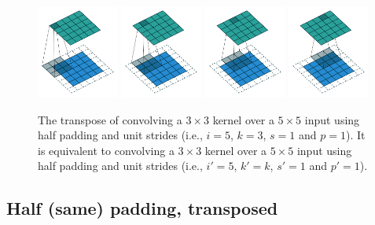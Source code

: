 \documentclass[notitlepage]{report}
\begin{document}
\begin{figure}[p]
    \centering
    \includegraphics[width=0.24\textwidth]{pdf/same_padding_no_strides_transposed_00.pdf}
    \includegraphics[width=0.24\textwidth]{pdf/same_padding_no_strides_transposed_01.pdf}
    \includegraphics[width=0.24\textwidth]{pdf/same_padding_no_strides_transposed_02.pdf}
    \includegraphics[width=0.24\textwidth]{pdf/same_padding_no_strides_transposed_03.pdf}
    \caption{\label{fig:same_padding_no_strides_transposed} The transpose of
        convolving a $3 \times 3$ kernel over a $5 \times 5$ input using half
        padding and unit strides (i.e., $i = 5$, $k = 3$, $s = 1$ and $p = 1$).
        It is equivalent to convolving a $3 \times 3$ kernel over a $5 \times 5$
        input using half padding and unit strides (i.e., $i' = 5$, $k' = k$, $s'
        = 1$ and $p' = 1$).}
\end{figure}

\subsection{Half (same) padding, transposed}
\end{document}
